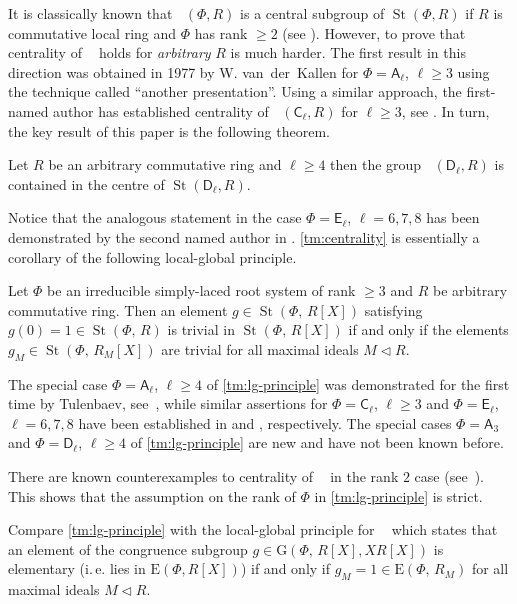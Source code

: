 \documentclass[11pt]{amsart}
\theoremstyle{plain} \declaretheorem[name=Theorem, Refname={Theorem,Theorems}]{tm} \Crefname{tm}{Theorem}{Theorems}
\numberwithin{equation}{section}
\theoremstyle{definition} \newtheorem{df}[lm]{Definition} \Crefname{df}{Definition}{Definitions}
\theoremstyle{remark} \newtheorem{rk}[lm]{Remark} \Crefname{rk}{Remark}{Remarks}
\newcommand{\E}{{\mathrm{E}}}
\newcommand{\GG}{{\mathrm{G}}}
\newcommand{\St}{\mathop{\mathrm{St}}\nolimits}
\newcommand{\Kt}{\mathop{\mathrm{K_2}}\nolimits}
\newcommand{\Ko}{\mathop{\mathrm{K_1}}\nolimits}
\newcommand{\rA}{\mathsf{A}}
\newcommand{\rC}{\mathsf{C}}
\newcommand{\rD}{\mathsf{D}}
\newcommand{\rE}{\mathsf{E}}
\begin{document}
It is classically known that $\Kt(\Phi, R)$ is a central subgroup of $\St(\Phi, R)$ if $R$ is commutative local ring and $\Phi$ has rank $\geq 2$ (see \cite{St73}).
However, to prove that centrality of $\Kt$ holds for \emph{arbitrary} $R$ is much harder.
The first result in this direction was obtained in 1977 by W. van~der~Kallen for $\Phi=\rA_\ell$, $\ell\geq 3$ using the technique called ``another presentation''.
Using a similar approach, the first-named author has established centrality of $\Kt(\rC_\ell, R)$ for $\ell\geq 3$, see \cite{Lav}.
In turn, the key result of this paper is the following theorem.
\begin{tm}\label{tm:centrality}  Let $R$ be an arbitrary commutative ring and $\ell\geq 4$ then 
the group $\Kt(\rD_\ell, R)$ is contained in the centre of $\St(\rD_\ell, R)$. \end{tm}
Notice that the analogous statement in the case $\Phi=\rE_\ell$, $\ell=6,7,8$ has been demonstrated by the second named author in \cite{SCh}.
\cref{tm:centrality} is essentially a corollary of the following local-global principle.
\begin{tm}\label{tm:lg-principle} Let $\Phi$ be an irreducible simply-laced root system of rank $\geq 3$ and $R$ be arbitrary commutative ring.
Then an element $g\in\St(\Phi,\,R[X])$ satisfying $g(0)=1\in\St(\Phi,\,R)$ is trivial in $\St(\Phi,\,R[X])$
if and only if the elements $g_M\in\St(\Phi,\,R_M[X])$ are trivial for all maximal ideals $M\triangleleft R$. \end{tm} 

The special case $\Phi=\rA_\ell$, $\ell\geq 4$ of \cref{tm:lg-principle} was demonstrated for the first time by Tulenbaev, see~\cite[Theorem~2.1]{Tul},
while similar assertions for $\Phi=\rC_\ell$, $\ell\geq 3$ and $\Phi=\rE_\ell$, $\ell=6,7,8$ have been established in \cite{Lav2} and \cite{SCh}, respectively.
The special cases $\Phi=\rA_3$ and $\Phi=\rD_\ell$, $\ell\geq 4$ of \cref{tm:lg-principle} are new and have not been known before.

There are known counterexamples to centrality of $\Kt$ in the rank $2$ case (see~\cite{W}).
This shows that the assumption on the rank of $\Phi$ in \cref{tm:lg-principle} is strict.

Compare \cref{tm:lg-principle} with the local-global principle for $\Ko$ which states that an element of the congruence subgroup $g\in \GG(\Phi,\,R[X], XR[X])$ is elementary
(i.\,e. lies in $\E(\Phi, R[X])$) if and only if $g_M=1\in\E(\Phi,\,R_M)$ for all maximal ideals $M \triangleleft R$.
\end{document}
